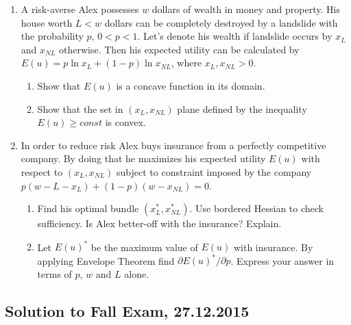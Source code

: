 \documentclass[12pt]{article} %
\theoremstyle{definition} %
\begin{document}
\begin{enumerate}[resume]
\item A risk-averse Alex possesses $w$ dollars of wealth in money and property.  His house worth $L < w$ dollars can be completely destroyed by a landslide with the probability $p$, $0 < p < 1$. Let’s denote his wealth if landslide occurs by $x_L$ and $x_{NL}$ otherwise. Then his expected utility can be calculated by $E(u) = p \ln x_L + (1-p) \ln x_{NL}$, where $x_L, x_{NL} > 0$.
\begin{enumerate}
\item Show that $E(u)$ is a concave function in its domain.
\item Show that the set in  $(x_L, x_{NL})$ plane defined by the inequality $E(u)\geq const$  is convex.
\end{enumerate}

\item In order to reduce risk Alex buys insurance from a perfectly competitive company. By doing that he maximizes his expected utility $E(u)$ with respect to $(x_L, x_{NL})$ subject to constraint imposed by the company $p(w-L-x_L)+(1-p)(w-x_{NL})=0$.
\begin{enumerate}
\item  Find his optimal bundle  $(x_L^*, x_{NL}^*)$. Use bordered Hessian to check sufficiency. Is Alex better-off with the insurance? Explain.
\item Let $E(u)^*$ be the maximum value of $E(u)$ with insurance. By applying Envelope Theorem find $\partial E(u)^* / \partial p$. Express your answer in terms of $p$, $w$ and $L$ alone.
\end{enumerate}


\end{enumerate}

\subsection{Solution to Fall Exam, 27.12.2015}
\end{document}
